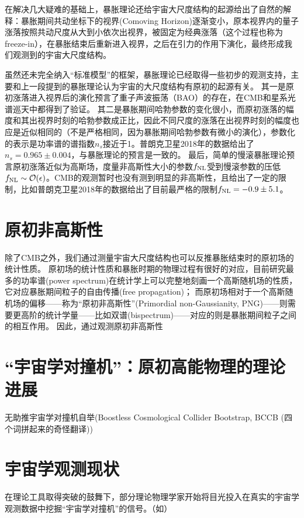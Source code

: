 在解决几大疑难的基础上，暴胀理论还给宇宙大尺度结构的起源给出了自然的解释：暴胀期间共动坐标下的视界(Comoving Horizon)逐渐变小，原本视界内的量子涨落按照共动尺度从大到小依次出视界，被固定为经典涨落（这个过程也称为freeze-in），在暴胀结束后重新进入视界，之后在引力的作用下演化，最终形成我们观测到的宇宙大尺度结构。

虽然还未完全纳入“标准模型”的框架，暴胀理论已经取得一些初步的观测支持，主要和上一段提到的暴胀理论认为宇宙的大尺度结构有原初的起源有关。
其一是原初涨落进入视界后的演化预言了重子声波振荡（BAO）的存在，在CMB和星系光谱巡天中都得到了验证。
其二是暴胀期间哈勃参数的变化很小，而原初涨落的幅度和其出视界时刻的哈勃参数成正比，因此不同尺度的涨落在出视界时刻的幅度也应是近似相同的（不是严格相同，因为暴胀期间哈勃参数有微小的演化），参数化的表示是功率谱的谱指数$n_s$接近于1。普朗克卫星2018年的数据给出了$n_s=0.965\pm0.004$，与暴胀理论的预言是一致的。
最后，简单的慢滚暴胀理论预言原初涨落近似为高斯场，度量非高斯性大小的参数$f_{\rm NL}$受到慢滚参数的压低$f_{\rm NL} \sim \mathcal{O}(\epsilon)$。CMB的观测暂时也没有测到明显的非高斯性，且给出了一定的限制，比如普朗克卫星2018年的数据给出了目前最严格的限制$f_{\rm NL}=-0.9\pm5.1$。

\section{原初非高斯性}


除了CMB之外，我们通过测量宇宙大尺度结构也可以反推暴胀结束时的原初场的统计性质。
原初场的统计性质和暴胀时期的物理过程有很好的对应，目前研究最多的功率谱(power spectrum)在统计学上可以完整地刻画一个高斯随机场的性质，它对应暴胀期间粒子的自由传播(free propagation)；
而原初场相对于一个高斯随机场的偏移——称为“原初非高斯性”(Primordial non-Gaussianity, PNG)——则需要更高阶的统计学量——比如双谱(bispectrum)——对应的则是暴胀期间粒子之间的相互作用。
因此，通过观测原初非高斯性

\section{“宇宙学对撞机”：原初高能物理的理论进展}

无助推宇宙学对撞机自举(Boostless Cosmological Collider Bootstrap, BCCB (四个词拼起来的奇怪翻译))

\section{宇宙学观测现状}

在理论工具取得突破的鼓舞下，部分理论物理学家开始将目光投入在真实的宇宙学观测数据中挖掘“宇宙学对撞机”的信号。（如\cite{cabass2024boss,sohn2024CCCMB}）


